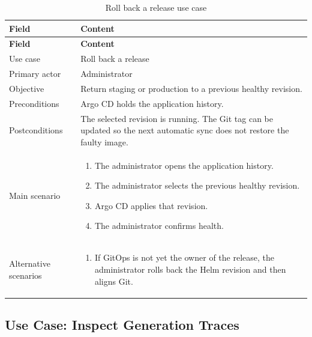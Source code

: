 \begingroup
\footnotesize
\renewcommand{\arraystretch}{1.15}
\begin{longtable}{|L{3.2cm}|L{11.6cm}|}
\caption{Roll back a release use case}
\label{tab:use-case-rollback-release} \\
\hline
{}
\textbf{Field} & \textbf{Content} \\
\hline
\endfirsthead
\hline
{}
\textbf{Field} & \textbf{Content} \\
\hline
\endhead
Use case & Roll back a release \\
\hline
Primary actor & Administrator \\
\hline
Objective & Return staging or production to a previous healthy revision. \\
\hline
Preconditions & Argo CD holds the application history. \\
\hline
Postconditions & The selected revision is running. The Git tag can be updated so the next automatic sync does not restore the faulty image. \\
\hline
Main scenario & \begin{enumerate}[leftmargin=1.5em,itemsep=0.1em,topsep=0.2em]
  \item The administrator opens the application history.
  \item The administrator selects the previous healthy revision.
  \item Argo CD applies that revision.
  \item The administrator confirms health.
\end{enumerate} \\
\hline
Alternative scenarios & \begin{enumerate}[label=A\arabic*.,leftmargin=2em,itemsep=0.1em,topsep=0.2em]
  \item If GitOps is not yet the owner of the release, the administrator rolls back the Helm revision and then aligns Git.
\end{enumerate} \\
\hline
\end{longtable}
\endgroup

\subsection{Use Case: Inspect Generation Traces}

